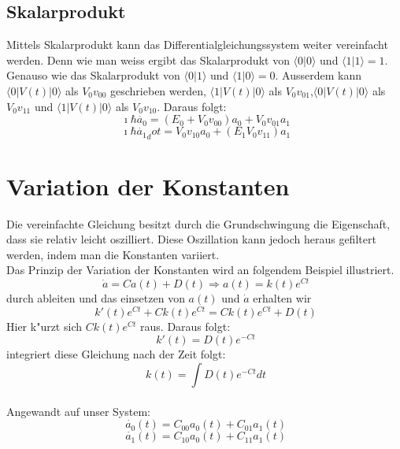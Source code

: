 \begin{refsection}
\subsection{Skalarprodukt}
Mittels Skalarprodukt kann das Differentialgleichungssystem weiter vereinfacht werden.
Denn wie man weiss ergibt das Skalarprodukt von $\langle0|0\rangle$ und $\langle1|1\rangle = 1$. Genauso wie das Skalarprodukt von $\langle0|1\rangle$ und $\langle1|0\rangle = 0$.
Ausserdem kann  $\langle0|V(t)|0\rangle$ als $V_{0}v_{00}$ geschrieben werden, $\langle1|V(t)|0\rangle$ als $V_{0}v_{01}$,$\langle0|V(t)|0\rangle$ als $V_{0}v_{11}$ und $\langle1|V(t)|0\rangle$ als $V_{0}v_{10}$.
Daraus folgt:
\[
\ \imath\hbar\dot{a_{0}} = (E_{0} + V_{0} v_{00}) a_{0} + V_{0} v_{01} a_{1}
\]
\[
\ \imath\hbar\dot{a_{1}}_dot = V_{0} v_{10} a_{0} + (E_{1} V_{0} v_{11}) a_{1}
\]


\section{Variation der Konstanten}
Die vereinfachte Gleichung besitzt durch die Grundschwingung die Eigenschaft, dass sie relativ leicht oszilliert. Diese Oszillation kann jedoch heraus gefiltert werden, indem man die Konstanten variiert. \\ Das Prinzip der Variation der Konstanten wird an folgendem Beispiel illustriert.\\

\[
\ \dot{a} = C a(t) + D(t) \Rightarrow a(t) = k(t) e^{C t}
\] 
durch ableiten und das einsetzen von $ a(t)$ und  $ \dot{a} $ erhalten wir\\

\[
\ k'(t) e^{C t} + C k(t) e^{C t} = C k(t) e^{C t} + D(t)
\] 
Hier k"urzt sich $ C k(t) e^{C t} $ raus.
Daraus folgt:\\
\[
\ k'(t) = D(t) e^{-C t}
\] 
integriert diese Gleichung nach der Zeit folgt:\\
\[
\ k(t) = \int D(t) e^{-C t} dt 
\]\\
 
Angewandt auf unser System:\\
\[
\ \dot{a_{0}}(t) = C_{00}a_{0}(t) + C_{01}a_{1}(t)
\]
\[
\ \dot{a_{1}}(t) = C_{10}a_{0}(t) + C_{11}a_{1}(t)
\]


\end{refsection}

